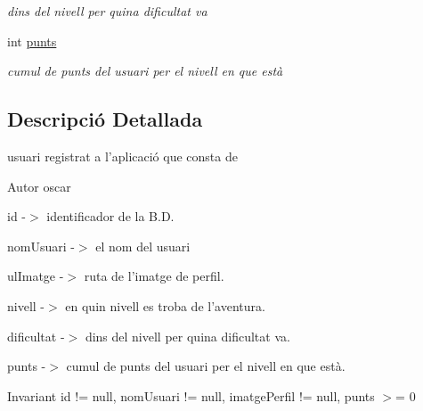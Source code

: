 \begin{DoxyCompactItemize}
\begin{DoxyCompactList}\small\item\em dins del nivell per quina dificultat va \end{DoxyCompactList}\item 
\hypertarget{classlogica_1_1_usuari_a63fadb8d875628e5d9b8652c4245490b}{int \hyperlink{classlogica_1_1_usuari_a63fadb8d875628e5d9b8652c4245490b}{punts}}\label{classlogica_1_1_usuari_a63fadb8d875628e5d9b8652c4245490b}

\begin{DoxyCompactList}\small\item\em cumul de punts del usuari per el nivell en que està \end{DoxyCompactList}\end{DoxyCompactItemize}


\subsection{Descripció Detallada}
usuari registrat a l'aplicació que consta de 

\begin{DoxyAuthor}{Autor}
oscar
\begin{DoxyItemize}
\item id -\/$>$ identificador de la B.\+D.
\item nom\+Usuari -\/$>$ el nom del usuari
\item ul\+Imatge -\/$>$ ruta de l'imatge de perfil.
\item nivell -\/$>$ en quin nivell es troba de l'aventura.
\item dificultat -\/$>$ dins del nivell per quina dificultat va.
\item punts -\/$>$ cumul de punts del usuari per el nivell en que està.
\end{DoxyItemize}
\end{DoxyAuthor}
\begin{DoxyInvariant}{Invariant}
id != null, nom\+Usuari != null, imatge\+Perfil != null, punts $>$= 0 
\end{DoxyInvariant}


